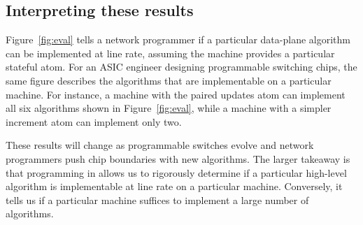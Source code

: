 \subsection{Interpreting these results}
Figure~\ref{fig:eval} tells a network programmer if a particular data-plane
algorithm can be implemented at line rate, assuming the \absmachine machine
provides a particular stateful atom. For an ASIC engineer designing
programmable switching chips, the same figure describes the algorithms that are
implementable on a particular \absmachine machine. For instance, a \absmachine
machine with the paired updates atom can implement all six algorithms shown in
Figure~\ref{fig:eval}, while a machine with a simpler increment atom can
implement only two.

These results will change as programmable switches evolve and network
programmers push chip boundaries with new algorithms.  The larger takeaway is
that programming in \pktlanguage allows us to rigorously determine if a
particular high-level algorithm is implementable at line rate on a particular
\absmachine machine. Conversely, it tells us if a particular \absmachine
machine suffices to implement a large number of algorithms.
